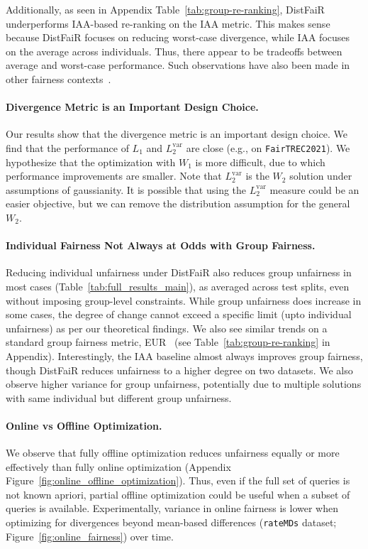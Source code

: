 Additionally, as seen in Appendix Table~\ref{tab:group-re-ranking},  DistFaiR underperforms IAA-based re-ranking on the IAA metric. This makes sense because DistFaiR focuses on reducing worst-case divergence, while IAA focuses on the average across individuals. Thus, there appear to be tradeoffs between average and worst-case performance. Such observations have also been made in other fairness contexts~\cite{yang2023change}. %

\paragraph{Divergence Metric is an Important Design Choice.}
Our results show that the divergence metric is an important design choice. We find that the performance of $L_1$ and $L_2^{\text{var}}$ are close  (e.g., on \texttt{FairTREC2021}). We hypothesize that the  optimization with $W_1$ is more difficult, due to which performance improvements are smaller. Note that $L_2^{\text{var}}$ is the $W_2$ solution under assumptions of gaussianity. It is possible that using the $L_2^{\text{var}}$ measure could be an easier objective, but we can remove the distribution assumption for the general $W_2$. 


\paragraph{Individual Fairness Not Always at Odds with Group Fairness.}
Reducing individual unfairness under DistFaiR also reduces group unfairness in most cases (Table~\ref{tab:full_results_main}), as averaged across test splits, even without imposing group-level constraints.  While group unfairness does increase in some cases, the degree of change cannot exceed a specific limit (upto individual unfairness) as per our theoretical findings.  
We also see similar trends on a standard group fairness metric,  EUR~\cite{morik2020controlling} (see Table~\ref{tab:group-re-ranking} in Appendix). Interestingly, the IAA baseline almost always improves group fairness, though  DistFaiR reduces unfairness to a higher degree on two datasets. We also observe higher variance for group unfairness, potentially due to multiple solutions with same individual but different group unfairness. 







\paragraph{Online vs Offline Optimization.}
We observe that fully offline optimization reduces unfairness equally or more effectively than fully online optimization (Appendix Figure~\ref{fig:online_offline_optimization}). Thus, even if the full set of queries is not known apriori, partial offline optimization could be useful when a subset of queries is available. Experimentally, variance in online fairness is lower when optimizing for divergences beyond mean-based differences (\texttt{rateMDs} dataset; Figure~\ref{fig:online_fairness}) over time. 


